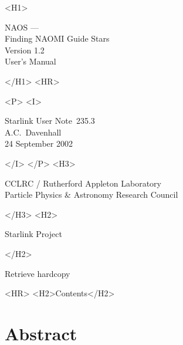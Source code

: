 \documentclass[twoside,11pt]{article}
\newcommand{\NAOSversion}{1.2~}
\newcommand{\stardoccategory}  {Starlink User Note}
\newcommand{\stardocsource}    {sun\stardocnumber}
\newcommand{\stardocnumber}    {235.3}
\newcommand{\stardocauthors}   {A.C.~Davenhall}
\newcommand{\stardocdate}      {24 September 2002}
\newcommand{\stardoctitle}     {NAOS --- \\ Finding NAOMI Guide Stars}
\newcommand{\stardocversion}   {Version \NAOSversion}
\newcommand{\stardocmanual}    {User's Manual}
\newcommand{\htmladdnormallink}[2]{#1}
\newcommand{\htmladdimg}[1]{}
\newcommand{\htmlref}[2]{#1}
\newcommand{\htmladdtonavigation}[1]{}
\newcommand{\xlabel}[1]{}
\renewcommand{\_}{\texttt{\symbol{95}}}
\begin{document}
\begin{htmlonly}
   \xlabel{}
   \begin{rawhtml} <H1> \end{rawhtml}
      \stardoctitle\\
      \stardocversion\\
      \stardocmanual
   \begin{rawhtml} </H1> <HR> \end{rawhtml}


   \begin{rawhtml} <P> <I> \end{rawhtml}
   \stardoccategory\ \stardocnumber \\
   \stardocauthors \\
   \stardocdate
   \begin{rawhtml} </I> </P> <H3> \end{rawhtml}
      \htmladdnormallink{CCLRC / Rutherford Appleton Laboratory}
                        {http://www.cclrc.ac.uk} \\
      \htmladdnormallink{Particle Physics \& Astronomy Research Council}
                        {http://www.pparc.ac.uk} \\
   \begin{rawhtml} </H3> <H2> \end{rawhtml}
      \htmladdnormallink{Starlink Project}{http://www.starlink.rl.ac.uk/}
   \begin{rawhtml} </H2> \end{rawhtml}
   \htmladdnormallink{\htmladdimg{source.gif} Retrieve hardcopy}
      {http://www.starlink.rl.ac.uk/cgi-bin/hcserver?\stardocsource}\\

  \label{stardoccontents}
  \begin{rawhtml} 
    <HR>
    <H2>Contents</H2>
  \end{rawhtml}
  \htmladdtonavigation{\htmlref{\htmladdimg{contents_motif.gif}}
        {stardoccontents}}

  \section{\xlabel{abstract}Abstract}
\end{htmlonly}
\end{document}
